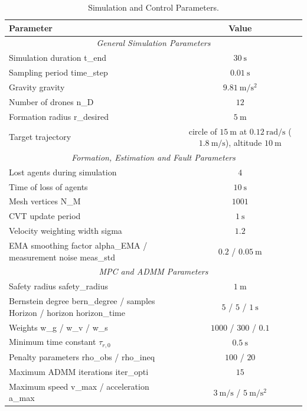 \begin{table}
    \centering
    \caption{Simulation and Control Parameters.}
    \label{tab.6:all_params}
    \begin{tabular}{l c}
    \hline
    \textbf{Parameter} & \textbf{Value} \\
    \hline

    \multicolumn{2}{c}{\textit{General Simulation Parameters}} \\
    \hline
    Simulation duration \gls{t_end} & $30~\mathrm{s}$ \\
    Sampling period \gls{time_step} & $0.01~\mathrm{s}$ \\
    Gravity \gls{gravity} & $9.81~\mathrm{m/s^2}$ \\
    Number of drones \gls{n_D} & $12$ \\
    Formation radius \gls{r_desired} & $5~\mathrm{m}$ \\
    Target trajectory & circle of $15~\mathrm{m}$ at $0.12~\mathrm{rad/s}$ ($1.8~\mathrm{m/s}$), altitude $10~\mathrm{m}$ \\
    \hline

    \multicolumn{2}{c}{\textit{Formation, Estimation and Fault Parameters}} \\
    \hline
    Lost agents during simulation & $4$ \\
    Time of loss of agents & $10~\mathrm{s}$ \\
    Mesh vertices \gls{N_M} & $1001$ \\
    \gls{CVT} update period & $1~\mathrm{s}$ \\
    Velocity weighting width \gls{sigma} & $1.2$ \\
    EMA smoothing factor \gls{alpha_EMA} / measurement noise \gls{meas_std} & $0.2$ / $0.05~\mathrm{m}$ \\
    \hline

    \multicolumn{2}{c}{\textit{MPC and ADMM Parameters}} \\
    \hline
    Safety radius \gls{safety_radius} & $1~\mathrm{m}$ \\
    Bernstein degree \gls{bern_degree} / samples \gls{Horizon} / horizon \gls{horizon_time} & $5$ / $5$ / $1~\mathrm{s}$ \\
    Weights \gls{w_g} / \gls{w_v} / \gls{w_s} & $1000$ / $300$ / $0.1$ \\
    Minimum time constant $\tau_{r,0}$ & $0.5~\mathrm{s}$ \\
    Penalty parameters \gls{rho_obs} / \gls{rho_ineq} & $100$ / $20$ \\
    Maximum \gls{ADMM} iterations \gls{iter_opti} & $15$ \\
    Maximum speed \gls{v_max} / acceleration \gls{a_max} & $3~\mathrm{m/s}$ / $5~\mathrm{m/s^2}$ \\
    \hline


\end{tabular}
\end{table}
